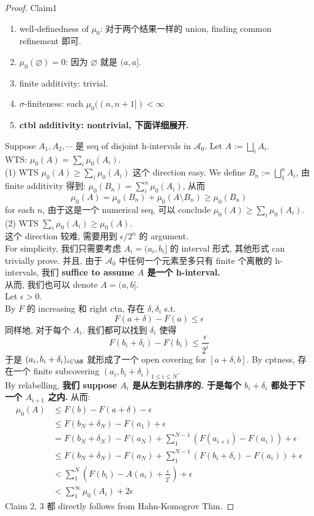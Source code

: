 \documentclass[lang=cn,11pt]{elegantbook}
\begin{document}
\begin{proof}
Claim1 
\begin{enumerate}
    \item well-definedness of $\mu_0$: 对于两个结果一样的 union, finding common refinement 即可.
    \item $\mu_0(\varnothing) = 0$: 因为 $\varnothing$ 就是 $(a,a]$.
    \item finite additivity: trivial.
    \item $\sigma$-finiteness: each $\mu_0((n, n+1]) < \infty$
    \item \textbf{ctbl additivity: nontrivial, 下面详细展开.}
\end{enumerate}
Suppose $A_1, A_2, \cdots$ 是 seq of disjoint h-intervals in $\mathcal{A}_0$. Let $A := \bigsqcup_{i}A_i $.\\
WTS: $\mu_0(A) = \sum_i \mu_0(A_i)$.\\
(1) WTS $\mu_0(A) \geq \sum_i \mu_0(A_i)$
这个 direction easy. We define $B_n  := \bigsqcup_1^n A_i$, 由 finite additivity 得到: $\mu_0(B_n) = \sum_{i}^n \mu_0(A_i)$, 从而 
$$
\mu_0(A) = \mu_0(B_n) + \mu_0(A \setminus B_n) \geq \mu_0(B_n)
$$ for each $n$, 由于这是一个 numerical seq, 可以 conclude $\mu_0(A) \geq \sum_i \mu_0(A_i)$.
(2) WTS $\sum_i \mu_0(A_i) \geq \mu_0(A)$.\\
这个 direction 较难, 需要用到 $\epsilon / 2^n$ 的 argument.\\
For simplicity, 我们只需要考虑 $A_i = (a_i, b_i]$ 的 interval 形式, 其他形式 can trivially prove. 并且, 由于 $\mathcal{A}_0$ 中任何一个元素至多只有 finite 个离散的 h-intervals, 我们 \textbf{suffice to assume $A$ 是一个 h-interval.} \\
从而, 我们也可以 denote $A = (a,b]$.\\
Let $\epsilon > 0$.\\
By $F$ 的 increasing 和 right ctn, 存在 $\delta, \delta_i$ s.t.
$$
F(a+ \delta)- F(a) \leq \epsilon
$$
同样地, 对于每个 $A_i$. 我们都可以找到 $\delta_i$ 使得 
$$
    F(b_i + \delta_i) - F(b_i) \leq \frac{\epsilon}{2^i}
$$
于是 $(a_i, b_i+\delta_i)_{i \in \bN}$ 就形成了一个 open covering for $[a+ \delta, b]$. By cptness, 存在一个 finite subcovering $(a_i, b_i+\delta_i)_{1 \leq i \leq N}$.\\
By relabelling, \textbf{我们 suppose $A_i$ 是从左到右排序的. 于是每个 $b_i + \delta_i$ 都处于下一个 $A_{i+1}$ 之内.}
从而:
\begin{align}
    \mu_0(A) & \leq F(b) - F(a+ \delta) - \epsilon \\
    &\leq F(b_N + \delta_N) - F(a_1) + \epsilon \\
    & =  F(b_N + \delta_N) - F(a_N) +\sum_1^{N-1} (F(a_{i+1}  ) - F(a_i)) + \epsilon \\
    & \leq  F(b_N + \delta_N) - F(a_N) +\sum_1^{N-1} (F(b_i + \delta_i  ) - F(a_i)) + \epsilon \\ & < \sum_1^N (F(b_i) - A(a_i) + \frac{\epsilon}{2^i}) + \epsilon
    \\ & < \sum_ 1^\infty \mu_0(A_i) + 2\epsilon
\end{align}
Claim 2, 3 都 directly follows from Hahn-Komogrov Thm.
\end{proof}
\end{document}
